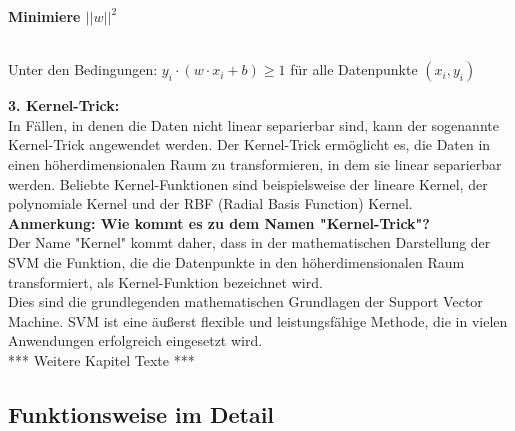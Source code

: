 \documentclass[12pt]{article}
\begin{document}
\begin{center}
\begin{large} \textbf{Minimiere $||w||^2$} \end{large} \\
Unter den Bedingungen: $y_i \cdot (w \cdot x_i + b) \geq 1$ für alle Datenpunkte ${(x_i,y_i)}$
\end{center}
\textbf{3. Kernel-Trick:}\\
In Fällen, in denen die Daten nicht linear separierbar sind, kann der sogenannte Kernel-Trick angewendet werden. Der Kernel-Trick ermöglicht es, die Daten in einen höherdimensionalen Raum zu transformieren, in dem sie linear separierbar werden. Beliebte Kernel-Funktionen sind beispielsweise der lineare Kernel, der polynomiale Kernel und der RBF (Radial Basis Function) Kernel.\\

\textbf{Anmerkung: Wie kommt es zu dem Namen "Kernel-Trick"?}\\
Der Name "Kernel" kommt daher, dass in der mathematischen Darstellung der SVM die Funktion, die die Datenpunkte in den höherdimensionalen Raum transformiert, als Kernel-Funktion bezeichnet wird.\\

Dies sind die grundlegenden mathematischen Grundlagen der Support Vector Machine. SVM ist eine äußerst flexible und leistungsfähige Methode, die in vielen Anwendungen erfolgreich eingesetzt wird.\\

*** Weitere Kapitel Texte *** 

\subsection{Funktionsweise im Detail}
\end{document}
